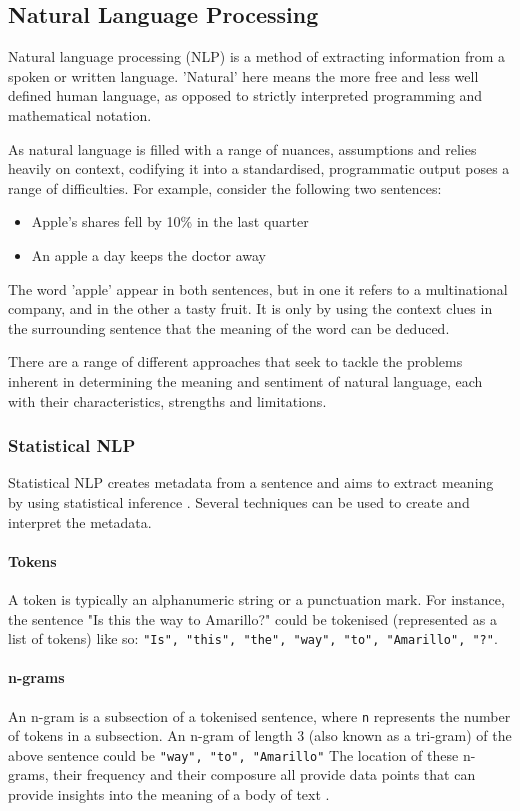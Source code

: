 \subsection{Natural Language Processing}
Natural language processing (NLP) is a method of extracting information from a spoken or written language. 'Natural' here means the more free and less well defined human language, as opposed to strictly interpreted programming and mathematical notation. \cite{jackson2002}

 As natural language is filled with a range of nuances, assumptions and relies heavily on context, codifying it into a standardised, programmatic output poses a range of difficulties. For example, consider the following two sentences:

\begin{itemize}
	\item Apple's shares fell by 10\% in the last quarter
	\item An apple a day keeps the doctor away
\end{itemize}

The word 'apple' appear in both sentences, but in one it refers to a multinational company, and in the other a tasty fruit. It is only by using the context clues in the surrounding sentence that the meaning of the word can be deduced.

There are a range of different approaches that seek to tackle the problems inherent in determining the meaning and sentiment of natural language, each with their  characteristics, strengths and limitations. 

\subsubsection{Statistical NLP}
Statistical NLP creates metadata from a sentence and aims to extract meaning by using statistical inference \cite{manning1999}. Several techniques can be used to create and interpret the metadata.

\paragraph{Tokens}
A token is typically an alphanumeric string or a punctuation mark. For instance, the sentence "Is this the way to Amarillo?" could be tokenised (represented as a list of tokens) like so: \texttt{"Is", "this", "the", "way", "to", "Amarillo", "?"}.\par
	
\paragraph{n-grams}
An n-gram is a subsection of a tokenised sentence, where \texttt{n} represents the number of tokens in a subsection. An n-gram of length 3 (also known as a tri-gram) of the above sentence could be \texttt{"way", "to", "Amarillo"}
	The location of these n-grams, their frequency and their composure all provide data points that can provide insights into the meaning of a body of text \cite{banerjee2003}.
	
